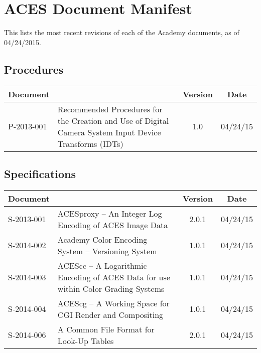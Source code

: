 \documentclass[10pt]{academydoc}
\begin{document}
\regularsectionformat

\section*{ACES Document Manifest}
This lists the most recent revisions of each of the Academy documents, as of 04/24/2015.

\subsection*{Procedures}
\begin{tabularx}{\linewidth}{|l X|c|c|}
\hline
\textbf{Document} & & \textbf{Version} & \textbf{Date} \\ \hline
P-2013-001 & Recommended Procedures for the Creation and Use of Digital Camera System Input Device Transforms (IDTs) & 1.0 & 04/24/15 \\ \hline
\end{tabularx}

\subsection*{Specifications}
\begin{tabularx}{\linewidth}{|l X|c|c|}
\hline
\textbf{Document} & & \textbf{Version} & \textbf{Date} \\ \hline
S-2013-001 & ACESproxy -- An Integer Log Encoding of ACES Image Data & 2.0.1 & 04/24/15 \\ \hline
S-2014-002 & Academy Color Encoding System -- Versioning System & 1.0.1 & 04/24/15 \\ \hline
S-2014-003 & ACEScc -- A Logarithmic Encoding of ACES Data for use within Color Grading Systems & 1.0.1 & 04/24/15 \\ \hline
S-2014-004 & ACEScg -- A Working Space for CGI Render and Compositing & 1.0.1 & 04/24/15 \\ \hline
S-2014-006 & A Common File Format for Look-Up Tables & 2.0.1 & 04/24/15 \\ \hline
\end{tabularx}
\end{document}
